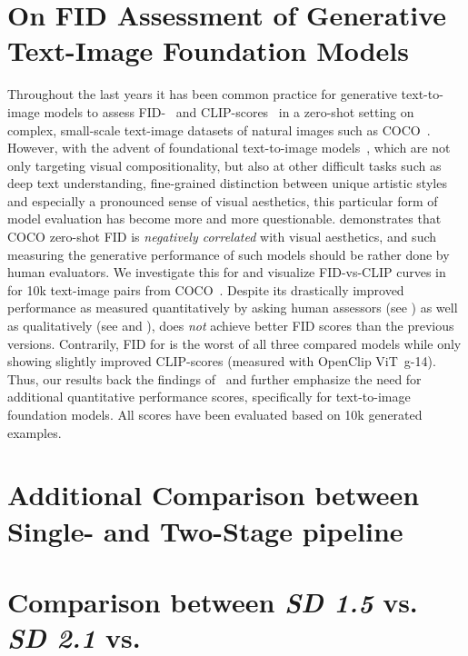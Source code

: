 \documentclass{article}
\begin{document}
\section{On FID Assessment of Generative Text-Image Foundation Models}
\label{suppsec:fid_app}
\fidvsclip
Throughout the last years it has been common practice for generative text-to-image models to assess FID-~\cite{heusel2017gans} and CLIP-scores~\cite{radford2021learning,ramesh2021zeroshot} in a zero-shot setting on complex, small-scale text-image datasets of natural images such as COCO~\cite{lin2015microsoft}. %
However, with the advent of foundational text-to-image models~\cite{saharia2022photorealistic,ramesh2022hierarchical,rombach2021high,balaji2022ediffi}, which are not only targeting visual compositionality, but also at other difficult tasks such as deep text understanding, fine-grained distinction between unique artistic styles and especially a pronounced sense of visual aesthetics, this particular form of model evaluation has become more and more questionable. 
\citet{kirstain2023pick} demonstrates that COCO zero-shot FID is \emph{negatively correlated} with visual aesthetics, and such measuring the generative performance of such models should be rather done by human evaluators.
%
We investigate this for \modelname and visualize FID-vs-CLIP curves in  for 10k text-image pairs from COCO~\cite{lin2015microsoft}. Despite its drastically improved performance as measured quantitatively by asking human assessors (see ) as well as qualitatively (see  and ), \modelname does \emph{not} achieve better FID scores than the previous \sdshort versions. 
Contrarily, FID for \modelname is the worst of all three compared models while only showing slightly improved CLIP-scores (measured with OpenClip ViT~g-14). 
Thus, our results back the findings of~\citet{kirstain2023pick} and further emphasize the need for additional quantitative performance scores, specifically for text-to-image foundation models. All scores have been evaluated based on 10k generated examples.          

\newpage
\section{Additional Comparison between Single- and Two-Stage \modelname pipeline}

\newpage
\section{Comparison between \textit{SD 1.5} vs. \textit{SD 2.1} vs. \modelname}
\sdoldcompapp
\end{document}
